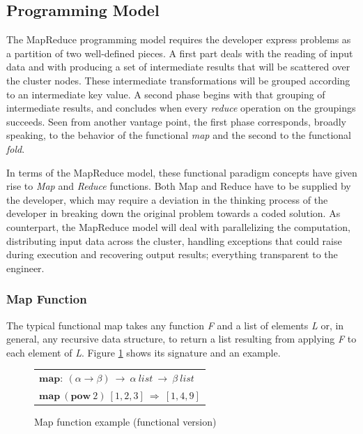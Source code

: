 \subsection{Programming Model}\label{subsec:programacionmapred}
\noindent The MapReduce programming model requires the developer express problems as a partition of two well-defined pieces. A first part deals with the reading of input data and with producing a set of intermediate results that will be scattered over the cluster nodes. These intermediate transformations will be grouped according to an intermediate key value. A second phase begins with that grouping of intermediate results, and concludes when every \emph{reduce} operation on the groupings succeeds. Seen from another vantage point, the first phase corresponds, broadly speaking, to the behavior of the functional \emph{map} and the second to the functional \emph{fold}.

In terms of the MapReduce model, these functional paradigm concepts have given rise to \emph{Map} and \emph{Reduce} functions. Both Map and Reduce have to be supplied by the developer, which may require a deviation in the thinking process of the developer in breaking down the original problem towards a coded solution. As counterpart, the MapReduce model will deal with parallelizing the computation, distributing input data across the cluster, handling exceptions that could raise during execution and recovering output results; everything transparent to the engineer.

\subsubsection{Map Function}\label{map}
\noindent The typical functional map takes any function \emph{F} and a list of elements \emph{L} or, in general, any recursive data structure, to return a list resulting from applying \emph{F} to each element of \emph{L}. Figure \ref{fig:functionalmap} shows its signature and an example.

\begin{figure}[tbp]
\begin{center}
\begin{tabular}{|l|}
\hline
$\mathbf{map:} \: \left ( \alpha \rightarrow \beta \right ) \: \rightarrow \: \alpha \: list \: \rightarrow \: \beta \: list$ \\
$\mathbf{map} \: \left( \mathbf{pow}\:2 \right) \: \left[ 1,2,3 \right] \: \Rightarrow \: \left[ 1,4,9 \right ]$ \\
\hline
\end{tabular}
\caption{Map function example (functional version)}
\label{fig:functionalmap}
\end{center}
\end{figure}

